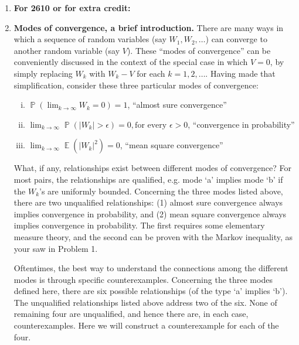 \documentclass[11pt]{report}
\DeclareMathOperator{\Prob}{\mathbb{P}}
\DeclareMathOperator{\Exp}{\mathbb{E}}
\begin{document}
\begin{enumerate}[1.]
          \pagebreak

    \item[] \hspace{-3ex} {\bf For 2610 or for extra credit:}







    \item {\bf Modes of convergence, a brief introduction.} There are many ways in which a sequence of random variables (say $W_1,W_2,\ldots$) can converge to another random variable (say $V$).
          These ``modes of convergence'' can be conveniently discussed in the context of  the special case in which $V=0$, by simply replacing $W_k$ with
          $W_k-V$ for each $k=1,2,\ldots$. Having made that simplification, consider these three particular modes of convergence:
          \begin{enumerate}[i.]
              \item $\displaystyle \Prob\left(\lim_{k\to\infty} W_k = 0\right) = 1$, ``almost sure convergence''
              \item $\displaystyle \lim_{k\to\infty}  \Prob\left(|W_k| > \epsilon\right) = 0, \text{for every $\epsilon>0$}$, ``convergence in probability''
              \item $\displaystyle \lim_{k\to\infty}  \Exp\left(|W_k|^2\right) = 0$, ``mean square convergence''
          \end{enumerate}
          What, if any, relationships exist between different modes of convergence? For most pairs, the relationships are qualified, e.g. mode `a' implies mode `b' if the $W_k$'s are uniformly bounded.
          Concerning the three modes listed above, there are two unqualified relationships: (1) almost sure convergence always implies convergence in probability, and (2) mean square convergence always implies convergence in probability. The first requires some elementary measure theory, and the second can be proven with the Markov inequality, as your saw in Problem 1.

          Oftentimes, the best way to understand the connections among the different modes is through specific counterexamples. Concerning the three modes defined here, there are six possible relationships (of the type `a' implies `b'). The unqualified relationships listed above address two of the six. None of remaining four are unqualified, and hence there are, in each case, counterexamples. Here we will construct a counterexample for each of the four.


\end{enumerate}
\end{document}
